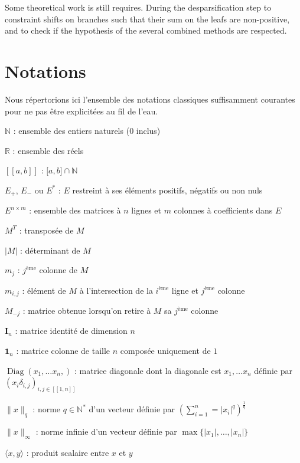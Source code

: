 \documentclass[12pt,a4paper]{reedthesis}
\newcommand \NN {\mathbb{N}}
\newcommand \RR {\mathbb{R}}
\DeclareMathOperator*{\diag}{Diag}
\theoremstyle{definition}
\theoremstyle{definition}
\theoremstyle{definition}
\theoremstyle{remark}
\begin{document}
Some theoretical work is still requires. During the desparsification step to constraint shifts on branches such that their sum on the leafs are non-positive, and to check if the hypothesis of the several combined methods are respected.

\appendix

\hypertarget{notations}{%
\chapter{Notations}\label{notations}}

Nous répertorions ici l'ensemble des notations classiques suffisamment courantes pour ne pas être explicitées au fil de l'eau.

\(\NN\) : ensemble des entiers naturels (\(0\) inclus)

\(\RR\) : ensemble des réels

\([\![a,b]\!]\) : \(\mathopen[a,b\mathclose] \cap \NN\)

\(E_+\), \(E_-\) ou \(E^*\) : \(E\) restreint à ses éléments positifs, négatifs ou non nuls

\(E^{n\times m}\) : ensemble des matrices à \(n\) lignes et \(m\) colonnes à coefficients dans \(E\)

\(M^T\) : transposée de \(M\)

\(\left|M\right|\) : déterminant de \(M\)

\(m_j\) : \(j^{\text{ème}}\) colonne de \(M\)

\(m_{i,j}\) : élément de \(M\) à l'intersection de la \(i^{\text{ème}}\) ligne et \(j^{\text{ème}}\) colonne

\(M_{-j}\) : matrice obtenue lorsqu'on retire à \(M\) sa \(j^{\text{ème}}\) colonne

\(\mathbf{I}_n\) : matrice identité de dimension \(n\)

\(\mathbf{1}_{n}\) : matrice colonne de taille \(n\) composée uniquement de \(1\)

\(\diag\left(x_1, \ldots x_n, \right)\) : matrice diagonale dont la diagonale est \(x_1, \ldots x_n\) définie par \(\left(x_i\delta_{i,j}\right)_{i,j \in [\![ 1, n]\!]}\)

\(\|x\|_q\) : norme \(q \in \NN^*\) d'un vecteur définie par \(\left(\sum_{i=1}^n = |x_i|^q \right)^{\frac{1}{q}}\)

\(\|x\|_\infty\) : norme infinie d'un vecteur définie par \(\max\{|x_1|, \ldots, |x_n|\}\)

\(\langle x, y \rangle\) : produit scalaire entre \(x\) et \(y\)
\end{document}
